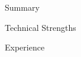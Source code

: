 \documentclass{resume}
\begin{document}
\begin{section}{Summary}
\end{section}

\begin{section}{Technical Strengths}
\end{section}

\begin{section}{Experience}
\end{section}

\break


\end{document}

